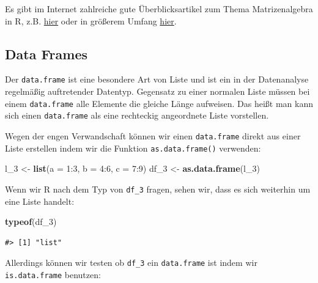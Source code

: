 \documentclass[]{tufte-book}
\newenvironment{Shaded}{}{}
\newcommand{\KeywordTok}[1]{\textcolor[rgb]{0.00,0.44,0.13}{\textbf{#1}}}
\newcommand{\DataTypeTok}[1]{\textcolor[rgb]{0.56,0.13,0.00}{#1}}
\newcommand{\DecValTok}[1]{\textcolor[rgb]{0.25,0.63,0.44}{#1}}
\newcommand{\StringTok}[1]{\textcolor[rgb]{0.25,0.44,0.63}{#1}}
\newcommand{\OperatorTok}[1]{\textcolor[rgb]{0.40,0.40,0.40}{#1}}
\newcommand{\NormalTok}[1]{#1}
\begin{document}
Es gibt im Internet zahlreiche gute Überblicksartikel zum Thema
Matrizenalgebra in R, z.B.
\href{https://www.statmethods.net/advstats/matrix.html}{hier} oder in
größerem Umfang
\href{https://www.math.uh.edu/~jmorgan/Math6397/day13/LinearAlgebraR-Handout.pdf}{hier}.

\subsection{Data Frames}\label{data-frames}

Der \texttt{data.frame} ist eine besondere Art von Liste und ist ein in
der Datenanalyse regelmäßig auftretender Datentyp. Gegensatz zu einer
normalen Liste müssen bei einem \texttt{data.frame} alle Elemente die
gleiche Länge aufweisen. Das heißt man kann sich einen
\texttt{data.frame} als eine rechteckig angeordnete Liste vorstellen.

Wegen der engen Verwandschaft können wir einen \texttt{data.frame}
direkt aus einer Liste erstellen indem wir die Funktion
\texttt{as.data.frame()} verwenden:

\begin{Shaded}
\begin{Highlighting}[]
\NormalTok{l_}\DecValTok{3}\NormalTok{ <-}\StringTok{ }\KeywordTok{list}\NormalTok{(}\DataTypeTok{a =} \DecValTok{1}\OperatorTok{:}\DecValTok{3}\NormalTok{, }\DataTypeTok{b =} \DecValTok{4}\OperatorTok{:}\DecValTok{6}\NormalTok{, }\DataTypeTok{c =} \DecValTok{7}\OperatorTok{:}\DecValTok{9}\NormalTok{)}
\NormalTok{df_}\DecValTok{3}\NormalTok{ <-}\StringTok{ }\KeywordTok{as.data.frame}\NormalTok{(l_}\DecValTok{3}\NormalTok{)}
\end{Highlighting}
\end{Shaded}

Wenn wir R nach dem Typ von \texttt{df\_3} fragen, sehen wir, dass es
sich weiterhin um eine Liste handelt:

\begin{Shaded}
\begin{Highlighting}[]
\KeywordTok{typeof}\NormalTok{(df_}\DecValTok{3}\NormalTok{)}
\end{Highlighting}
\end{Shaded}

\begin{verbatim}
#> [1] "list"
\end{verbatim}

Allerdings können wir testen ob \texttt{df\_3} ein \texttt{data.frame}
ist indem wir \texttt{is.data.frame} benutzen:
\end{document}
